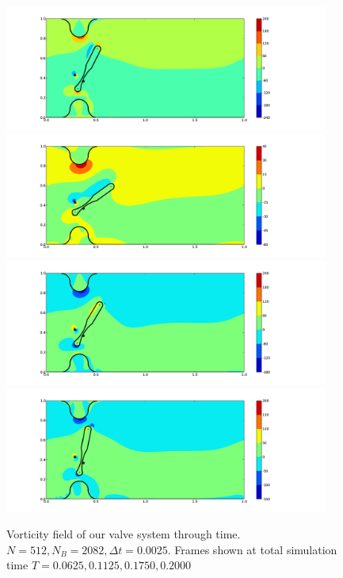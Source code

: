 \begin{figure}[p]
\begin{center}
\includegraphics[bb=1.3in .5in 13.5in 6in,width=4.2in,clip]{Images_Methodology/fig_c25_n512.pdf}
\hfill
\includegraphics[bb=1.3in .5in 13.5in 6in,width=4.2in,clip]{Images_Methodology/fig_c45_n512.pdf}
\hfill
\includegraphics[bb=1.3in .5in 13.5in 6.3in,width=4.2in,clip]{Images_Methodology/fig_c70_n512.pdf}
\hfill
\includegraphics[bb=1.3in .5in 13.5in 6.5in,width=4.2in,clip]{Images_Methodology/fig_c80_n512.pdf}
\end{center}
\caption{\small Vorticity field of our valve system through time. $N=512,N_B=2082,\Delta t=0.0025$. Frames shown at total simulation time $T=0.0625,0.1125,0.1750,0.2000$}
\label{fig:TimeProgression}
\end{figure}



